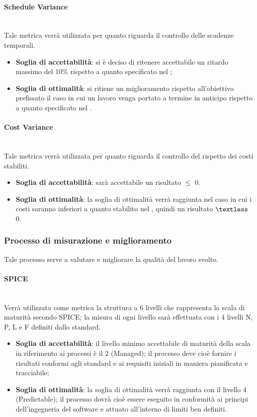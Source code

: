 \paragraph{Schedule Variance}
~\\Tale metrica verrà utilizzata per quanto riguarda il controllo delle scadenze temporali.
\begin{itemize}
	\item \textbf{Soglia di accettabilità}: si è deciso di ritenere accettabile un ritardo massimo del 10\% rispetto a quanto specificato nel \PdP{};
	\item \textbf{Soglia di ottimalità}: si ritiene un miglioramento rispetto all'obiettivo prefissato il caso in cui un lavoro venga portato a termine in anticipo rispetto a quanto specificato nel \PdP{}.
\end{itemize}

\paragraph{Cost Variance}
~\\Tale metrica verrà utilizzata per quanto riguarda il controllo del rispetto dei costi stabiliti.
\begin{itemize}
	\item \textbf{Soglia di accettabilità}: sarà accettabile un risultato $\le$ 0.
	\item \textbf{Soglia di ottimalità}: la soglia di ottimalità verrà raggiunta nel caso in cui i costi saranno inferiori a quanto stabilito nel \PdP{}, quindi un risultato $\textless$ 0.
\end{itemize}

\subsubsection{Processo di misurazione e miglioramento}
Tale processo serve a valutare e migliorare la qualità del lavoro svolto.

\paragraph{SPICE}
~\\Verrà utilizzata come metrica la struttura a 6 livelli che rappresenta la scala di maturità secondo SPICE; la misura di ogni livello sarà effettuata con i 4 livelli N, P, L e F definiti dallo standard.

\begin{itemize}
	\item \textbf{Soglia di accettabilità}: il livello minimo accettabile di maturità della scala in riferimento ai processi è il 2 (Managed); il processo deve cioè fornire i risultati conformi agli standard e ai requisiti iniziali in maniera pianificata e tracciabile;
	\item \textbf{Soglia di ottimalità}: la soglia di ottimalità verrà raggiunta con il livello 4 (Predictable); il processo dovrà cioè essere eseguito in conformità ai principi dell'ingegneria del software e attuato all'interno di limiti ben definiti.
\end{itemize}

